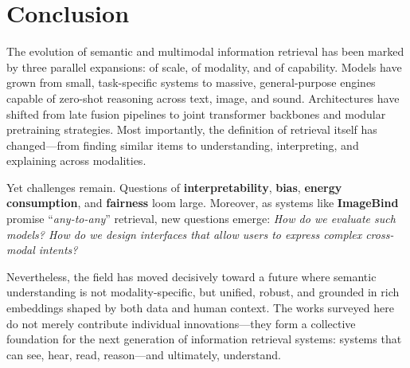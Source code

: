 \documentclass[conference]{IEEEtran}
\begin{document}
\section{Conclusion}

The evolution of semantic and multimodal information retrieval has been marked by three parallel expansions: of scale, of modality, and of capability. Models have grown from small, task-specific systems to massive, general-purpose engines capable of zero-shot reasoning across text, image, and sound. Architectures have shifted from late fusion pipelines to joint transformer backbones and modular pretraining strategies. Most importantly, the definition of retrieval itself has changed—from finding similar items to understanding, interpreting, and explaining across modalities.

Yet challenges remain. Questions of \textbf{interpretability}, \textbf{bias}, \textbf{energy consumption}, and \textbf{fairness} loom large. Moreover, as systems like \textbf{ImageBind} promise “\textit{any-to-any}” retrieval, new questions emerge: \textit{How do we evaluate such models? How do we design interfaces that allow users to express complex cross-modal intents?}

Nevertheless, the field has moved decisively toward a future where semantic understanding is not modality-specific, but unified, robust, and grounded in rich embeddings shaped by both data and human context. The works surveyed here do not merely contribute individual innovations—they form a collective foundation for the next generation of information retrieval systems: systems that can see, hear, read, reason—and ultimately, understand.




\end{document}
